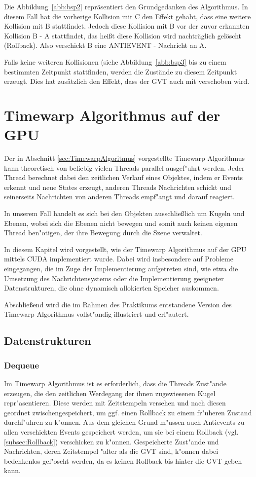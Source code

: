 \documentclass[a4paper, 10pt, openright, parskip, chapterprefix]{scrreprt}
\begin{document}
Die Abbildung~\ref{abb:bsp2} repräsentiert den Grundgedanken des Algorithmus. In diesem Fall hat die vorherige Kollision mit C den Effekt gehabt, dass eine weitere Kollision mit B stattfindet. Jedoch diese Kollision mit B vor der zuvor erkannten Kollision B - A stattfindet, das heißt diese Kollision wird nachträglich gelöscht (Rollback). Also verschickt B eine ANTIEVENT - Nachricht an A. 


Falls keine weiteren Kollisionen (siehe Abbildung~\ref{abb:bsp3} bis zu einem bestimmten Zeitpunkt stattfinden, werden die Zustände zu diesem Zeitpunkt erzeugt. Dies hat zusätzlich den Effekt, dass der GVT auch mit verschoben wird.

\chapter{Timewarp Algorithmus auf der GPU}
Der in Abschnitt \ref{sec:TimewarpAlgoritmus} vorgestellte Timewarp Algorithmus kann theoretisch von beliebig vielen Threads
parallel ausgef"uhrt werden. Jeder Thread berechnet dabei den zeitlichen Verlauf eines Objektes, indem er Events erkennt
und neue States erzeugt, anderen Threads Nachrichten schickt und seinerseits Nachrichten von anderen Threads empf"angt
und darauf reagiert. 

In unserem Fall handelt es sich bei den Objekten ausschlie\ss lich um Kugeln und Ebenen, wobei sich die Ebenen nicht
bewegen und somit auch keinen eigenen Thread ben"otigen, der ihre Bewegung durch die Szene verwaltet.

In diesem Kapitel wird vorgestellt, wie der Timewarp Algorithmus auf der GPU mittels CUDA implementiert wurde. Dabei wird
insbesondere auf Probleme eingegangen, die im Zuge der Implementierung aufgetreten sind, wie etwa die Umsetzung des
Nachrichtensystems oder die Implementierung geeigneter Datenstrukturen, die ohne dynamisch allokierten Speicher
auskommen.

Abschlie\ss end wird die im Rahmen des Praktikums entstandene Version des Timewarp Algorithmus vollst"andig illustriert
und erl"autert.

\section{Datenstrukturen}
\subsection{Dequeue}
Im Timewarp Algorithmus ist es erforderlich, dass die Threads Zust"ande erzeugen, die den zeitlichen Werdegang der ihnen zugewiesenen
Kugel repr"asentieren. Diese werden mit Zeitstempeln versehen und nach diesen geordnet zwischengespeichert, um ggf. einen Rollback zu einem
fr"uheren Zustand durchf"uhren zu k"onnen. Aus dem gleichen Grund m"ussen auch Antievents zu allen verschickten Events gespeichert
werden, um sie bei einem Rollback (vgl. \ref{subsec:Rollback}) verschicken zu k"onnen.
Gespeicherte Zust"ande und Nachrichten, deren Zeitstempel "alter als die GVT sind, k"onnen dabei bedenkenlos gel"oscht
werden, da es keinen Rollback bis hinter die GVT geben kann.
\end{document}
